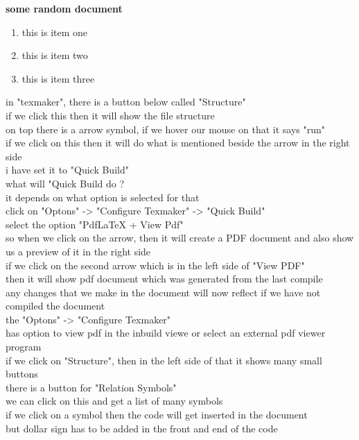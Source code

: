 \documentclass[12pt]{article}
\begin{document}
\textbf{some random document}

\begin{enumerate}


\item this is item one
\item this is item two
\item this is item three

\end{enumerate}

in "texmaker", there is a button below called "Structure"\\
if we click this then it will show the file structure\\

on top there is a arrow symbol, if we hover our mouse on that it says "run"\\
if we click on this then it will do what is mentioned beside the arrow in the right side\\
i have set it to "Quick Build"\\
what will "Quick Build do ?\\
it depends on what option is selected for that\\
click on "Optons" -> "Configure Texmaker" -> "Quick Build"\\
select the option "PdfLaTeX + View Pdf"\\
so when we click on the arrow, then it will create a PDF document and also show us a preview of it in the right side\\

if we click on the second arrow which is in the left side of "View PDF"\\
then it will show pdf document which was generated from the last compile\\
any changes that we make in the document will now reflect if we have not compiled the document\\

the "Optons" -> "Configure Texmaker"\\
has option to view pdf in the inbuild viewe or select an external pdf viewer program\\


if we click on "Structure", then in the left side of that it shows many small buttons\\
there is a button for "Relation Symbols"\\
we can click on this and get a list of many symbols\\
if we click on a symbol then the code will get inserted in the document\\
but dollar sign has to be added in the front and end of the code\\
\end{document}

